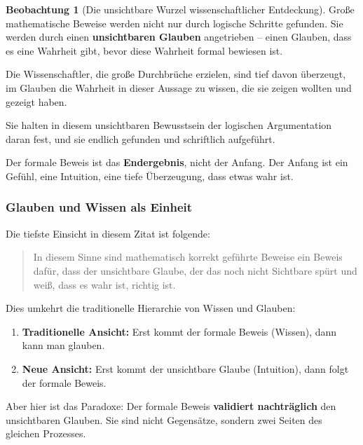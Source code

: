 \documentclass[a4paper, 12pt, twoside, openright]{report}
\theoremstyle{definition}
\newtheorem{beobachtung}{Beobachtung}
\theoremstyle{definition}
\begin{document}
\begin{beobachtung}[Die unsichtbare Wurzel wissenschaftlicher Entdeckung]
	Große mathematische Beweise werden nicht nur durch logische Schritte gefunden. Sie werden durch einen \textbf{unsichtbaren Glauben} angetrieben -- einen Glauben, dass es eine Wahrheit gibt, bevor diese Wahrheit formal bewiesen ist.
	
	Die Wissenschaftler, die große Durchbrüche erzielen, sind tief davon überzeugt, im Glauben die Wahrheit in dieser Aussage zu wissen, die sie zeigen wollten und gezeigt haben.
	
	Sie halten in diesem unsichtbaren Bewusstsein der logischen Argumentation daran fest, und sie endlich gefunden und schriftlich aufgeführt.
	
	Der formale Beweis ist das \textbf{Endergebnis}, nicht der Anfang. Der Anfang ist ein Gefühl, eine Intuition, eine tiefe Überzeugung, dass etwas wahr ist.
\end{beobachtung}

\subsubsection*{Glauben und Wissen als Einheit}

Die tiefste Einsicht in diesem Zitat ist folgende:

\begin{quote}
In diesem Sinne sind mathematisch korrekt geführte Beweise ein Beweis dafür, dass der unsichtbare Glaube, der das noch nicht Sichtbare spürt und weiß, dass es wahr ist, richtig ist.
\end{quote}

Dies umkehrt die traditionelle Hierarchie von Wissen und Glauben:

\begin{enumerate}
	\item \textbf{Traditionelle Ansicht:} Erst kommt der formale Beweis (Wissen), dann kann man glauben.
	
	\item \textbf{Neue Ansicht:} Erst kommt der unsichtbare Glaube (Intuition), dann folgt der formale Beweis.
\end{enumerate}

Aber hier ist das Paradoxe: Der formale Beweis \textbf{validiert nachträglich} den unsichtbaren Glauben. Sie sind nicht Gegensätze, sondern zwei Seiten des gleichen Prozesses.
\end{document}
